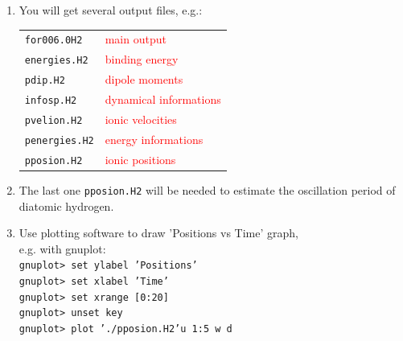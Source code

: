 \documentclass[10pt]{beamer}
\begin{document}
\begin{frame}
\begin{enumerate}
\item You will get several output files, e.g.:\\
\vspace*{0.2cm}
\begin{tabular}{ll}
\vspace*{0.1cm}
{\tt for006.0H2} & {\small{\textcolor{red}{main output}}}\\
\vspace*{0.1cm}
{\tt energies.H2} &{\small{\textcolor{red}{binding energy}}}\\
\vspace*{0.1cm}
{\tt pdip.H2}& {\small{\textcolor{red}{dipole moments}}}\\
\vspace*{0.1cm}
{\tt infosp.H2} & {\small{\textcolor{red}{dynamical informations}}}\\
\vspace*{0.1cm}
{\tt pvelion.H2} & {\small{\textcolor{red}{ionic velocities}}}\\
\vspace*{0.1cm}
{\tt penergies.H2} & {\small{\textcolor{red}{energy informations}}}\\
\vspace*{0.1cm}
{\tt pposion.H2} & {\small{\textcolor{red}{ionic positions}}}\\
\end{tabular}
\vspace*{0.2cm}
\item The last one {\tt pposion.H2} will be needed to estimate the oscillation period of diatomic hydrogen. \\
\vspace*{0.2cm}
\item Use plotting software to draw   'Positions vs Time' graph, \\e.g. with gnuplot:\\
\vspace*{0.1cm}
{\tt gnuplot> set ylabel 'Positions'}\\
{\tt gnuplot> set xlabel 'Time'}\\
{\tt gnuplot> set xrange [0:20]}\\
{\tt gnuplot> unset key}\\
{\tt gnuplot> plot './pposion.H2'u 1:5 w d}\\
\end{enumerate}
\end{frame}
\end{document}
